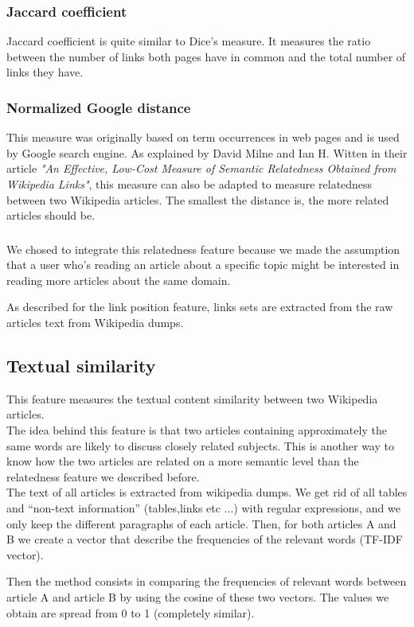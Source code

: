 \subsubsection*{Jaccard coefficient}
Jaccard coefficient is quite similar to Dice's measure. It measures the ratio between the number of links both pages have in common and the total number of links they have.\

\subsubsection*{Normalized Google distance}
This measure was originally based on term occurrences in web pages and is used by Google search engine. As explained by David Milne and Ian H. Witten in their article \textit{"An Effective, Low-Cost Measure of Semantic Relatedness Obtained from Wikipedia Links"}, this measure can also be adapted to measure relatedness between two Wikipedia articles. The smallest the distance is, the more related articles should be.\

\subsubsection*{}
We chosed to integrate this relatedness feature because we made the assumption that a user who’s reading an article about a specific topic might be interested in reading more articles about the same domain. 

As described for the link position feature, links sets are extracted from the raw articles text from Wikipedia dumps.

\subsection{Textual similarity}

This feature measures the textual content similarity between two Wikipedia articles.  \\

The idea behind this feature is that two articles containing approximately the same words are likely to discuss closely related subjects. This is another way to know how the two articles are related on a more semantic level than the relatedness feature we described before.\\

The text of all articles is extracted from wikipedia dumps. We get rid of all tables and “non-text information” (tables,links etc ...) with regular expressions, and we only keep the different paragraphs of each article. Then, for both articles A and B we create a vector that describe the frequencies of the relevant words (TF-IDF vector).\

Then the method consists in comparing the frequencies of relevant words between article A and article B by using the cosine of these two vectors. The values we obtain are spread from 0 to 1 (completely similar).

